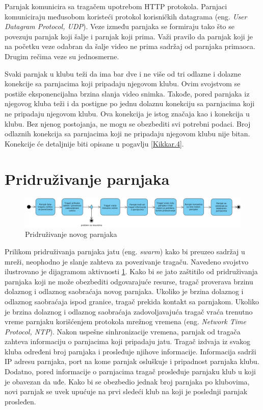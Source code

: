 \documentclass[12pt,oneside]{memoir}
\begin{document}
Parnjak komunicira sa tragačem upotrebom HTTP protokola. Parnjaci komuniciraju međusobom koristeći protokol korisničkih datagrama (eng. \textit{User Datagram Protocol, UDP}). Veze između parnjaka se formiraju tako što se povezuju parnjak koji šalje i parnjak koji prima. Važi pravilo da parnjak koji je na početku veze odabran da šalje video ne prima sadržaj od parnjaka primaoca. Drugim rečima veze su jednosmerne.  

Svaki parnjak u klubu teži da ima bar dve i ne više od tri odlazne i dolazne konekcije sa parnjacima koji pripadaju njegovom klubu. Ovim svojstvom se postiže eksponencijalna brzina slanja video snimka. Takođe, pored parnjaka iz njegovog kluba teži i da postigne po jednu dolaznu konekciju sa parnjacima koji ne pripadaju njegovom klubu. Ova konekcija je istog značaja kao i konekcija u klubu. Bez njenog postojanja, ne mogu se obezbediti svi potrebni podaci. Broj odlaznih konekcija sa parnjacima koji ne pripadaju njegovom klubu nije bitan. Konekcije će detaljnije biti opisane u pogavlju \ref{Kikkar.4}. 


\section{Pridruživanje parnjaka}
\label{Kikkar.2}

\begin{figure}[!ht]
  \centering
  \includegraphics[width=1.05\textwidth]{slike/pridruzivanje.jpg}
  \caption{Pridruživanje novog parnjaka}
  \label{fig:pridruzivanje}
\end{figure}
\par


Prilikom pridruživanja parnjaka jatu (eng. \textit{swarm}) kako bi preuzeo sadržaj u mreži, neophodno je slanje zahteva za povezivanje tragaču. Navedeno svojstvo ilustrovano je dijagramom aktivnosti \ref{fig:pridruzivanje}. Kako bi se jato zaštitilo od pridruživanja parnjaka koji ne može obezbediti odgovarajuće resurse, tragač proverava brzinu dolaznog i odlaznog saobraćaja novog parnjaka. Ukoliko je brzina dolaznog i odlaznog saobraćaja ispod granice, tragač prekida kontakt sa parnjakom. Ukoliko je brzina dolaznog i odlaznog saobraćaja zadovoljavajuća tragač vraća trenutno vreme parnjaku korišćenjem protokola mrežnog vremena (eng. \textit{Network Time Protocol, NTP}). Nakon uspešne sinhronizacije vremena, parnjak od tragača zahteva informaciju o parnjacima koji pripadaju jatu. Tragač izdvaja iz svakog kluba određeni broj parnjaka i prosleđuje njihove informacije. Informacija sadrži IP adresu parnjaka, port na kome parnjak osluškuje i pripadnost parnjaka klubu.  Dodatno, pored informacije o parnjacima tragač prosleđuje parnjaku klub u koji je obavezan da uđe. Kako bi se obezbedio jednak broj parnjaka po klubovima, novi parnjak se uvek upućuje na prvi sledeći klub na koji je poslednji parnjak prosleđen. 
\end{document}
